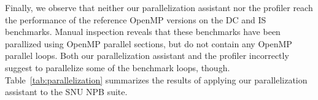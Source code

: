 Finally, we observe that neither our parallelization assistant nor the profiler
reach the performance of the reference OpenMP versions on the DC and IS
benchmarks. Manual inspection reveals that these benchmarks have been parallized
using OpenMP parallel sections, but do not contain any OpenMP parallel
loops. Both our parallelization assistant and the profiler incorrectly suggest
to parallelize some of the benchmark loops,
though. Table~\ref{tab:parallelization} summarizes the results of applying our
parallelization assistant to the SNU NPB suite.

